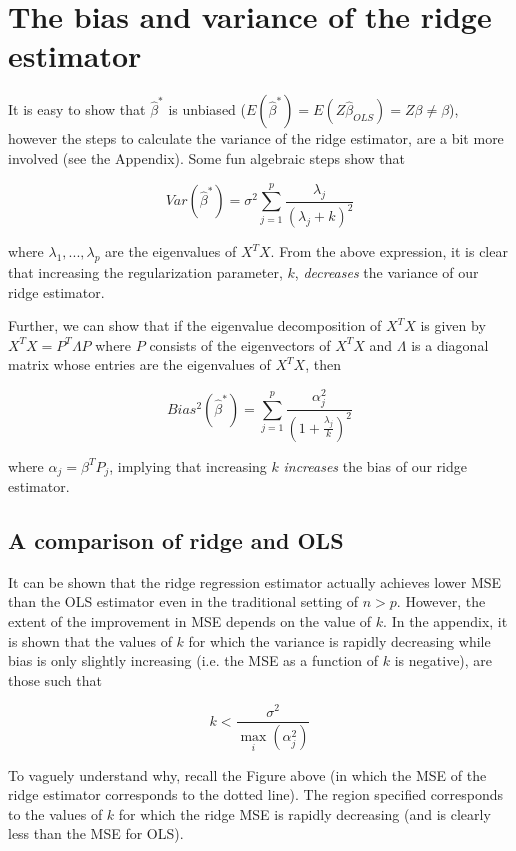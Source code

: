 \section{The bias and variance of the ridge estimator}

It is easy to show that $\hat{\beta}^*$ is unbiased ($E\left(\hat{\beta}^*\right) = E(Z \hat{\beta}_{OLS}) = Z\beta \neq \beta$), however the steps to calculate the variance of the ridge estimator, are a bit more involved (see the Appendix). Some fun algebraic steps show that

$$Var\left(\hat{\beta}^*\right) = \sigma^2 \sum_{j=1}^p \frac{\lambda_j}{(\lambda_j + k)^2}$$

where $\lambda_1, ..., \lambda_p$ are the eigenvalues of $X^TX$. From the above expression, it is clear that increasing the regularization parameter, $k$, \textit{decreases} the variance of our ridge estimator.

Further, we can show that if the eigenvalue decomposition of $X^TX$ is given by $X^TX = P^T \Lambda P$ where $P$ consists of the eigenvectors of $X^TX$ and $\Lambda$ is a diagonal matrix whose entries are the eigenvalues of $X^TX$, then 

$$Bias^2\left(\hat{\beta}^*\right) = \sum_{j=1}^p \frac{\alpha_j^2}{\left( 1 + \frac{\lambda_j}{k} \right)^2 }$$


where $\alpha_j = \beta^T P_j$, implying that increasing $k$ \textit{increases} the bias of our ridge estimator.




\subsection*{A comparison of ridge and OLS}



It can be shown that the ridge regression estimator actually achieves lower MSE than the OLS estimator even in the traditional setting of $n > p$. However, the extent of the improvement in MSE depends on the value of $k$. In the appendix, it is shown that the values of $k$ for which the variance is rapidly decreasing while bias is only slightly increasing (i.e. the MSE as a function of $k$ is negative), are those such that

$$k < \frac{\sigma^2}{\max_i(\alpha_j^2)}$$

To vaguely understand why, recall the Figure above (in which the MSE of the ridge estimator corresponds to the dotted line). The region specified corresponds to the values of $k$ for which the ridge MSE is rapidly decreasing (and is clearly less than the MSE for OLS).


